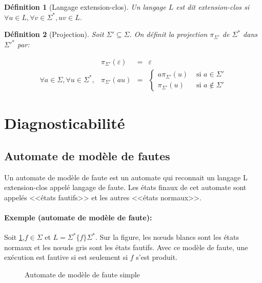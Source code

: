 \documentclass[10pt,a4paper]{article}
\newtheorem{mydef}{D\'efinition}
\begin{document}
\begin{mydef}[Langage extension-clos]
Un langage $L$ est dit extension-clos si $\forall u \in L, \forall v \in \Sigma^*, uv \in L$.
\end{mydef}

\begin{mydef}[Projection]
Soit $\Sigma'\subseteq \Sigma$. On d\'efinit la projection $\pi_{\Sigma'}$ de $\Sigma^*$ dans $\Sigma'^*$ par:

$$\begin{array}{llll}
&\pi_{\Sigma'}(\varepsilon) &= &\varepsilon\\
\forall a \in \Sigma, \forall u \in \Sigma^*, &\pi_{\Sigma'}(au) &= &\left\{\begin{array}{ll}
a\pi_{\Sigma'}(u) &\text{ si } a \in \Sigma'\\
\pi_{\Sigma'}(u) &\text{ si } a \not\in \Sigma'
\end{array}\right.
\end{array}$$
\end{mydef}

\section{Diagnosticabilit\'e}

\subsection{Automate de modèle de fautes}
Un automate de modèle de faute est un automate qui reconnait un langage L extension-clos appelé langage de faute. Les états finaux de cet automate sont appelés <<\'etats fautifs>> et les autres <<\'etats normaux>>.
    
    \paragraph{Exemple (automate de mod\`ele de faute): }
    
   Soit \ref{modele de fautes},$f\in \Sigma$ et $L  = \Sigma^*\{f\}\Sigma^*$. Sur la figure, les nœuds blancs sont les états normaux et les nœuds gris sont les \'etats fautifs. Avec ce mod\`ele de faute, une ex\'ecution est fautive si est seulement si $f$ s'est produit.
        \begin{figure}[H]
                \centering
                \caption{Automate de mod\`ele de faute simple}
                \label{modele de fautes}
        \end{figure}
        
\end{document}
